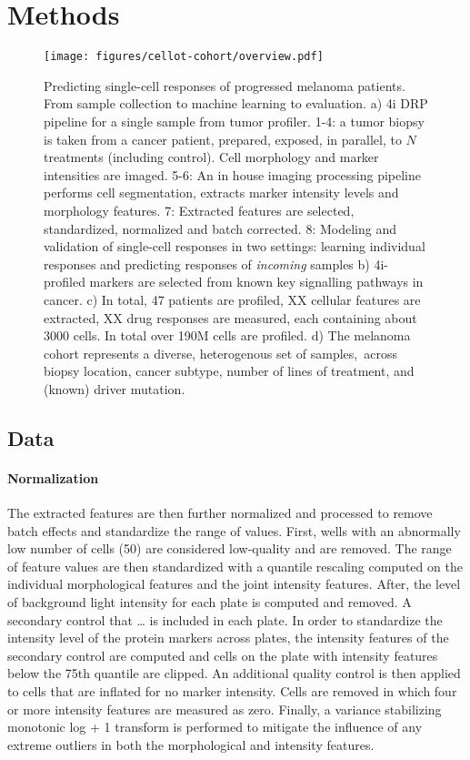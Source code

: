 \section{Methods}

\begin{figure*}[ht]
  \label{cellot-cohort-overview}
  \centering
  \texttt{[image: figures/cellot-cohort/overview.pdf]}
  \caption{
    Predicting single-cell responses of progressed melanoma patients.
    From sample collection to machine learning to evaluation.
    a) 4i DRP pipeline for a single sample from tumor profiler.
    1-4: a tumor biopsy is taken from a cancer patient, prepared,
    exposed, in parallel, to $N$ treatments (including control).
    Cell morphology and marker intensities are imaged.
    5-6: An in house imaging processing pipeline performs cell segmentation,
    extracts marker intensity levels and morphology features.
    7: Extracted features are selected, standardized, normalized and batch corrected.
    8: Modeling and validation of single-cell responses in two settings: learning individual responses and predicting responses of \emph{incoming} samples
    b) 4i-profiled markers are selected from known key signalling pathways in cancer.
    c) In total, 47 patients are profiled, XX cellular features are extracted, XX drug responses are measured, each containing about 3000 cells. In total over 190M cells are profiled.
    d) The melanoma cohort represents a diverse, heterogenous set of samples,\
    across biopsy location, cancer subtype, number of lines of treatment, and (known) driver mutation.
  }
\end{figure*}

\subsection{Data}

\paragraph{Normalization}
The extracted features are then further normalized and processed to remove batch effects and standardize the range of values. First, wells with an abnormally low number of cells (50) are considered low-quality and are removed. The range of feature values are then standardized with a quantile rescaling computed on the individual morphological features and the joint intensity features. After, the level of background light intensity for each plate is computed and removed. A secondary control that … is included in each plate. In order to standardize the intensity level of the protein markers across plates, the intensity features of the secondary control are computed and cells on the plate with intensity features below the 75th quantile are clipped. An additional quality control is then applied to cells that are inflated for no marker intensity. Cells are removed in which four or more intensity features are measured as zero. Finally, a variance stabilizing monotonic log + 1 transform is performed to mitigate the influence of any extreme outliers in both the morphological and intensity features.

